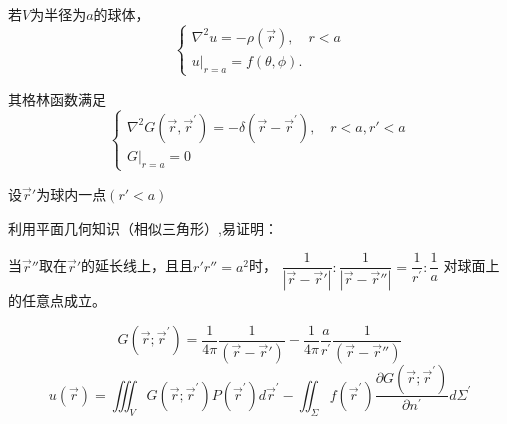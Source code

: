 \begin{ex}[三维泊松方程球内问题]
    若$V$为半径为$a$的球体，
    $$\begin{cases}\nabla^{2}u=-\rho(\vec{r}),\quad r<a\\u|_{r=a}=f(\theta,\phi).\end{cases}$$
    
    其格林函数满足
    $$\begin{cases}\nabla^{2}G(\vec{r},\vec{r}^{\prime})=-\delta(\vec{r}-\vec{r}^{\prime}),\quad r<a,r'<a\\G|_{r=a}=0\end{cases}$$

    设$\vec{r}'$为球内一点$(r'<a)$

    利用平面几何知识（相似三角形）,易证明：
    
    当$\vec{r}''$取在$\vec{r}'$的延长线上，且且$r'r''=a^2$时，
    $\dfrac{1}{|\vec{r}-\vec{r}'|}:\dfrac{1}{|\vec{r}-\vec{r}''|}=\dfrac{1}{r^{\prime}}:\dfrac{1}{a}$
    对球面上的任意点成立。

    
    $$G(\vec{r};\vec{r}^{\prime})=\frac{1}{4\pi}\frac{1}{(\vec{r}-\vec{r}')}-\frac{1}{4\pi}\frac{a}{r^{\prime}}\frac{1}{(\vec{r}-\vec{r}'')}$$
    $$u(\vec{r})=\iiint_{V}G(\vec{r};\vec{r}^{\prime})P(\vec{r}^{\prime})d\vec{r}^{\prime}-\iint_{\Sigma}f(\vec{r}^{\prime})\frac{\partial G(\vec{r};\vec{r}^{\prime})}{\partial n^{\prime}}d\Sigma^{\prime}$$
\end{ex}

